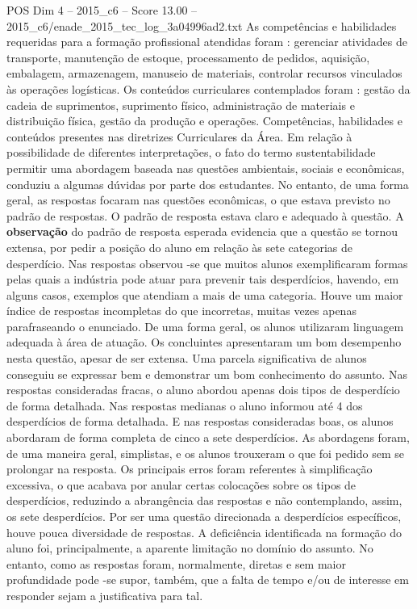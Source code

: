 \begin{textsample}{POS Dim 4 – 2015\_c6 – Score 13.00 – 2015\_c6/enade\_2015\_tec\_log\_3a04996ad2.txt}
As competências e habilidades requeridas para a formação profissional atendidas foram : gerenciar atividades de transporte, manutenção de estoque, processamento de pedidos, aquisição, embalagem, armazenagem, manuseio de materiais, controlar recursos vinculados às operações logísticas.
Os conteúdos curriculares contemplados foram : gestão da cadeia de suprimentos, suprimento físico, administração de materiais e distribuição física, gestão da produção e operações.
Competências, habilidades e conteúdos presentes nas diretrizes Curriculares da Área.
Em relação à possibilidade de diferentes interpretações, o fato do termo sustentabilidade permitir uma abordagem baseada nas questões ambientais, sociais e econômicas, conduziu a algumas dúvidas por parte dos estudantes.
No entanto, de uma forma geral, as respostas focaram nas questões econômicas, o que estava previsto no padrão de respostas.
O padrão de resposta estava claro e adequado à questão.
A \textbf{observação} do padrão de resposta esperada evidencia que a questão se tornou extensa, por pedir a posição do aluno em relação às sete categorias de desperdício.
Nas respostas observou -se que muitos alunos exemplificaram formas pelas quais a indústria pode atuar para prevenir tais desperdícios, havendo, em alguns casos, exemplos que atendiam a mais de uma categoria.
Houve um maior índice de respostas incompletas do que incorretas, muitas vezes apenas parafraseando o enunciado.
De uma forma geral, os alunos utilizaram linguagem adequada à área de atuação.
Os concluintes apresentaram um bom desempenho nesta questão, apesar de ser extensa.
Uma parcela significativa de alunos conseguiu se expressar bem e demonstrar um bom conhecimento do assunto.
Nas respostas consideradas fracas, o aluno abordou apenas dois tipos de desperdício de forma detalhada.
Nas respostas medianas o aluno informou até 4 dos desperdícios de forma detalhada.
E nas respostas consideradas boas, os alunos abordaram de forma completa de cinco a sete desperdícios.
As abordagens foram, de uma maneira geral, simplistas, e os alunos trouxeram o que foi pedido sem se prolongar na resposta.
Os principais erros foram referentes à simplificação excessiva, o que acabava por anular certas colocações sobre os tipos de desperdícios, reduzindo a abrangência das respostas e não contemplando, assim, os sete desperdícios.
Por ser uma questão direcionada a desperdícios específicos, houve pouca diversidade de respostas.
A deficiência identificada na formação do aluno foi, principalmente, a aparente limitação no domínio do assunto.
No entanto, como as respostas foram, normalmente, diretas e sem maior profundidade pode -se supor, também, que a falta de tempo e/ou de interesse em responder sejam a justificativa para tal.

\end{textsample}
